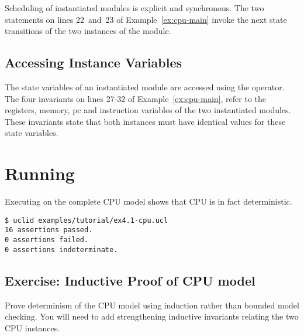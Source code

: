 Scheduling of instantiated modules is explicit and synchronous. The two  statements on lines 22~and~23 of Example~\ref{ex:cpu-main} invoke the next state transitions of the two instances of the  module.

\subsection{Accessing Instance Variables}
The state variables of an instantiated module are accessed using the \codelike{->} operator. The four invariants on lines 27-32 of Example~\ref{ex:cpu-main}, refer to the registers, memory, pc and instruction variables of the two instantiated modules. These invariants state that both instances must have identical values for these state variables.


\section{Running \uclid{}}

Executing \uclid{} on the complete CPU model shows that CPU is in fact deterministic. 

\begin{Verbatim}[frame=single, samepage=true]
$ uclid examples/tutorial/ex4.1-cpu.ucl 
16 assertions passed.
0 assertions failed.
0 assertions indeterminate.
\end{Verbatim}

\subsection{Exercise: Inductive Proof of CPU model}
Prove determinism of the CPU model using induction rather than bounded model checking. You will need to add strengthening inductive invariants relating the two CPU instances.
